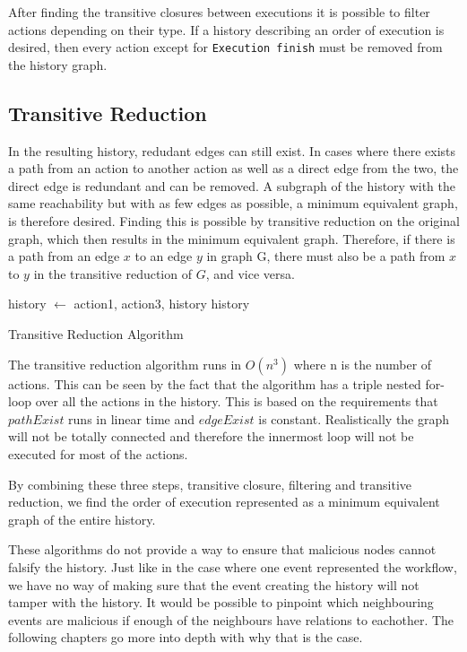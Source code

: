 	\newpar After finding the transitive closures between executions it is possible to filter actions depending on their type. If a history describing an order of execution is desired, then every action except for \texttt{Execution finish} must be removed from the history graph. 
	
	\subsection{Transitive Reduction}
	\newpar In the resulting history, redudant edges can still exist. In cases where there exists a path from an action to another action as well as a direct edge from the two, the direct edge is redundant and can be removed.	A subgraph of the history with the same reachability but with as few edges as possible, a minimum equivalent graph, is therefore desired. Finding this is possible by transitive reduction on the original graph, which then results in the minimum equivalent graph. Therefore, if there is a path from an edge $x$ to an edge $y$ in graph G, there must also be a path from $x$ to $y$ in the transitive reduction of $G$, and vice versa. 
	
	\begin{algorithm}
		\begin{algorithmic}
										\State history $\leftarrow$  {action1, action3, history}
									\EndIf
								\EndIf
							\EndFor
						\EndIf
					\EndFor
				\EndFor
			\State
			\Return history
			\EndFunction
		\end{algorithmic}
		\caption{Transitive Reduction Algorithm}
	\end{algorithm}
	
	\newpar The transitive reduction algorithm runs in $O(n^3)$ where n is the number of actions. This can be seen by the fact that the algorithm has a triple nested for-loop over all the actions in the history. This is based on the requirements that $pathExist$ runs in linear time and $edgeExist$ is constant. Realistically the graph will not be totally connected and therefore the innermost loop will not be executed for most of the actions.
	
	\newpar By combining these three steps, transitive closure, filtering and transitive reduction, we find the order of execution represented as a minimum equivalent graph of the entire history. 
	
	\newpar These algorithms do not provide a way to ensure that malicious nodes cannot falsify the history. Just like in the case where one event represented the workflow, we have no way of making sure that the event creating the history will not tamper with the history. It would be possible to pinpoint which neighbouring events are malicious if enough of the neighbours have relations to eachother. The following chapters go more into depth with why that is the case.
	